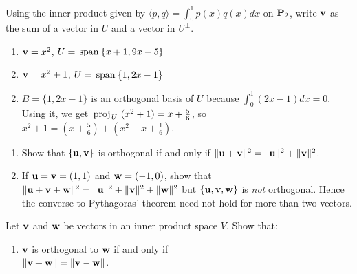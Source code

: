 \begin{multicols}{2}
\begin{ex}
Using the inner product given by $\langle p, q \rangle = \int_{0}^{1} p(x)q(x)dx$ on $\textbf{P}_{2}$, write $\textbf{v}$ as the sum of a vector in $U$ and a vector in $U^{\perp}$.

\begin{enumerate}[label={\alph*.}]
\item $\textbf{v} = x^{2}$, $U = \thinspace\operatorname{span\medspace}\{x + 1, 9x - 5\}$

\item $\textbf{v} = x^{2} + 1$, $U = \thinspace\operatorname{span\medspace}\{1, 2x - 1\}$

\end{enumerate}
\begin{sol}
\begin{enumerate}[label={\alph*.}]
\setcounter{enumi}{1}
\item  $B = \{1, 2x - 1\}$ is an orthogonal basis of $U$ because 
$\int_{0} ^ {1} (2x - 1)dx = 0$. Using it, we get $\thinspace\operatorname{proj\medspace}_{\!U}\,{(x^2 + 1)} = x + \tfrac{5}{6}$, so $x^2 + 1 = (x + \frac{5}{6}) + (x^2 -x + \frac{1}{6})$.

\end{enumerate}
\end{sol}
\end{ex}

\begin{ex}
\begin{enumerate}[label={\alph*.}]
\item Show that $\{\textbf{u}, \textbf{v}\}$ is orthogonal if and only if $\|\textbf{u} + \textbf{v}\|^{2} = \|\textbf{u}\|^{2} + \|\textbf{v}\|^{2}$.

\item If $\textbf{u} = \textbf{v} = (1, 1)$ and $\textbf{w} = (-1, 0)$, show that $\|\textbf{u} + \textbf{v} + \textbf{w}\|^{2} = \|\textbf{u}\|^{2} + \|\textbf{v}\|^{2} + \|\textbf{w}\|^{2}$ but $\{\textbf{u}, \textbf{v}, \textbf{w}\}$ is \textit{not} orthogonal. Hence the converse to Pythagoras' theorem need not hold for more than two vectors.

\end{enumerate}
\end{ex}

\begin{ex}
Let $\textbf{v}$ and $\textbf{w}$ be vectors in an inner product space $V$. Show that:

\begin{enumerate}[label={\alph*.}]
\item $\textbf{v}$ is orthogonal to $\textbf{w}$ if and only if \\ $\|\textbf{v} + \textbf{w}\| = \|\textbf{v} - \textbf{w}\|$.


\end{enumerate}
\end{ex}
\end{multicols}

